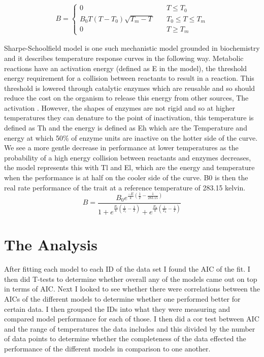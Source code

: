 \documentclass[12pt]{article}
\begin{document}
  \begin{equation}
    \begin{split}
        B = \left\{
                \begin{array}{ll}
                    0 & \quad T \leq T_0 \\
                    B_0 T (T-T_0) \sqrt{T_m-T} & \quad T_0 \leq T \leq T_m \\
                    0 & \quad T \geq T_m
                \end{array}
            \right.
        \end{split}
  \end{equation}

  Sharpe-Schoolfield model \cite{Schoolfield1981} is one such mechanistic model grounded in biochemistry and it describes temperature response curves in the following way. Metabolic reactions have an activation energy (defined as E in the model), the threshold energy requirement for a collision between reactants to result in a reaction. This threshold is lowered through catalytic enzymes which are reusable and so should reduce the cost on the organism to release this energy from other sources, The activation . However, the shapes of enzymes are not rigid and so at higher temperatures they can denature to the point of inactivation, this temperature is defined as Th and the energy is defined as Eh which are the Temperature and energy at which 50\% of enzyme units are inactive on the hotter side of the curve. We see a more gentle decrease in performance at lower temperatures as the probability of a high energy collision between reactants and enzymes decreases, the model represents this with Tl and El, which are the energy and temperature when the performance is at half on the cooler side of the curve. B0 is then the real rate performance of the trait at a reference temperature of 283.15 kelvin. \\
  
  \begin{equation}
    B = \frac{B_0 e^{\frac{-E}{k} (\frac{1}{T} - \frac{1}{283.15})}}
    { 1 + e^{\frac{E_l}{k} (\frac{1}{T_l} - \frac{1}{T})} + 
    e^{\frac{E_h}{k} (\frac{1}{T_h} - \frac{1}{T})}}
  \end{equation}
  \cite{Zwietering1991b}
  \cite{Dell2011a}
  \cite{DeLong2017b}

  \section{The Analysis}
  After fitting each model to each ID of the data set I found the AIC of the fit. I then did T-tests to determine whether overall any of the models came out on top in terms of AIC. Next I looked to see whether there were correlations between the AICs of the different models to determine whether one performed better for certain data. I then grouped the IDs into what they were measuring and compared model performance for each of those. I then did a cor test between AIC and the range of temperatures the data includes and this divided by the number of data points to determine whether the completeness of the data effected the performance of the different models in comparison to one another.\\
\end{document}
